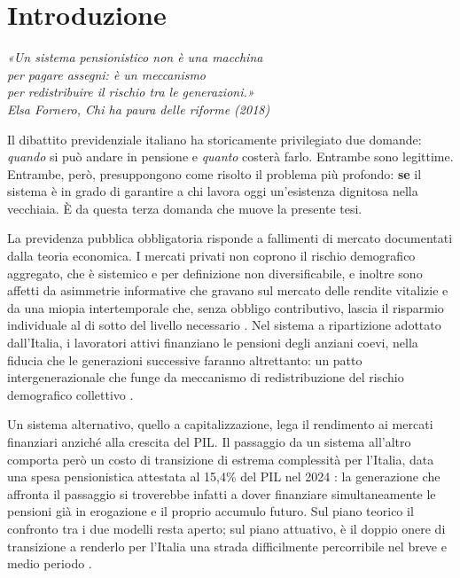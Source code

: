 \chapter*{Introduzione}

\begin{flushright}
\itshape
«Un sistema pensionistico non è una macchina\\
per pagare assegni: è un meccanismo\\
per redistribuire il rischio tra le generazioni.»\\[4pt]
\upshape
Elsa Fornero, \textit{Chi ha paura delle riforme} (2018)
\end{flushright}

\vspace{1em}

\noindent
Il dibattito previdenziale italiano ha storicamente privilegiato due domande:
\textit{quando} si può andare in pensione e \textit{quanto} costerà farlo.
Entrambe sono legittime. Entrambe, però, presuppongono come risolto il problema
più profondo: \textbf{se} il sistema è in grado di garantire a chi lavora oggi
un'esistenza dignitosa nella vecchiaia. È da questa terza domanda che muove la
presente tesi.

La previdenza pubblica obbligatoria risponde a fallimenti di mercato documentati
dalla teoria economica. I mercati privati non coprono il rischio demografico
aggregato, che è sistemico e per definizione non diversificabile, e inoltre sono affetti da asimmetrie informative che gravano sul mercato delle rendite
vitalizie e da una miopia intertemporale che, senza obbligo contributivo, lascia il
risparmio individuale al di sotto del livello necessario
\cite{Artoni2014, Bosi2018}. Nel sistema a ripartizione adottato dall'Italia,
i lavoratori attivi finanziano le pensioni degli anziani coevi, nella fiducia che
le generazioni successive faranno altrettanto: un patto intergenerazionale che
funge da meccanismo di redistribuzione del rischio demografico collettivo
\cite{Bosi2018}.

Un sistema alternativo, quello a capitalizzazione, lega il rendimento ai mercati
finanziari anziché alla crescita del PIL. Il passaggio da un sistema all'altro 
comporta però un costo di transizione di estrema complessità per l'Italia, 
data una spesa pensionistica attestata al 15,4\% del PIL nel 2024 \cite{MEF_RGS2025}: 
la generazione che affronta il passaggio si troverebbe infatti a dover finanziare 
simultaneamente le pensioni già in erogazione e il proprio accumulo futuro. 
Sul piano teorico il confronto tra i due modelli resta aperto; sul piano attuativo,
è il doppio onere di transizione a renderlo per l'Italia una strada difficilmente
percorribile nel breve e medio periodo \cite{Artoni2014}.

